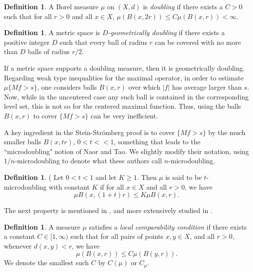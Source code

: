 \documentclass[12pt]{amsart}
\theoremstyle{definition}
\newtheorem{definition}[theorem]{Definition}
\theoremstyle{parrafo}
\begin{document}
\begin{definition} A Borel measure $\mu$ on $(X,d)$ is {\em doubling}  if there exists a 
$C> 0 $ such that for all $r>0 $ and all $x\in X$, $\mu (B(x, 2 r)) \le C\mu(B(x,r)) < \infty$. 
\end{definition}


\begin{definition} \label{geomdoub} A metric space is {\it $D$-geometrically doubling}  if there exists a positive
integer $D$ such that every ball of radius $r$ can be covered with no more than $D$ balls
of radius $r/2$. 
\end{definition}

If a metric space supports a doubling measure, then it is geometrically doubling.
Regarding weak type inequalities for the maximal operator, in order to estimate $\mu \{M f > s\}$, one considers balls $B(x,r)$ over which 
$|f|$ has average
larger than $s$. Now, while in the uncentered case any such ball is contained in the corresponding
level set, this is not so for the centered maximal function. Thus, using the balls $B(x,r)$ to cover
$\{M f > s\}$ can be very inefficient. 

A key ingredient in the Stein-Str\"omberg proof is to cover
$\{M f > s\}$ by the much smaller balls $B(x,t r)$, $0 < t <<1$, something that leads to the
``microdoubling" notion of Naor and Tao. 
We slightly modify their notation, using $1/n$-microdoubling
to denote what these authors call  $n$-microdoubling.

 \begin{definition} (\cite[p. 735] {NaTa} Let $0 < t < 1$ and let $K\ge 1$. Then 
  $\mu$ is said to be $t$-microdoubling with constant $K$ if for all $x \in X$ and all $r >0$,
we have
$$
\mu B\left(x,\left(1 + t \right) r \right) \le K \mu B(x,r).
$$
\end{definition}

The next property is mentioned in \cite{NaTa}, and more extensively studied
in \cite {A2}. 

\begin{definition} \label{loccomp}  A  measure $\mu$ satisfies a {\it local comparability condition} 
if there
exists a constant $C\in[1, \infty)$ such that for  all pairs of points $x,y\in X$, and all $r >0$,
whenever $d(x,y) < r$, we have 
$$\mu(B(x,r))\le C \mu(B(y,r)).$$
 We denote the
smallest such $C$ by $C(\mu)$ or $C_\mu$.
\end{definition}
\end{document}
